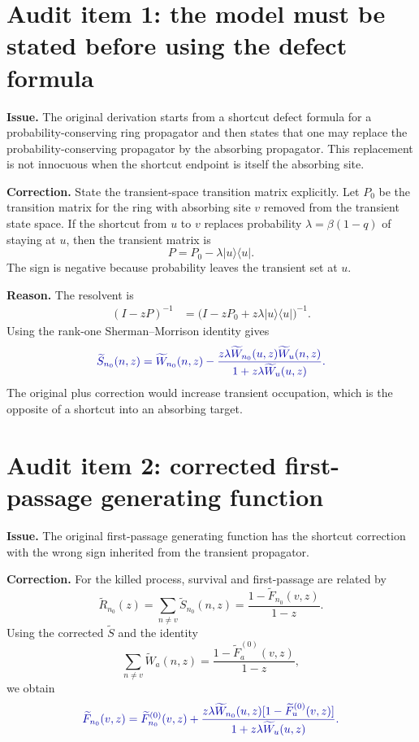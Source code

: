 \documentclass[11pt]{article}
\newcommand{\wt}{\widetilde}
\newcommand{\Corrected}[1]{\textcolor{blue!65!black}{#1}}
\newcommand{\Issue}[1]{\par\medskip\noindent\textbf{Issue.} #1\par}
\newcommand{\Fix}[1]{\par\noindent\textbf{Correction.} #1\par}
\newcommand{\Reason}[1]{\par\noindent\textbf{Reason.} #1\par\medskip}
\begin{document}
\section{Audit item 1: the model must be stated before using the defect formula}

\Issue{The original derivation starts from a shortcut defect formula for a probability-conserving
ring propagator and then states that one may replace the probability-conserving propagator by the
absorbing propagator.  This replacement is not innocuous when the shortcut endpoint is itself the
absorbing site.}

\Fix{State the transient-space transition matrix explicitly.  Let $P_0$ be the transition matrix
for the ring with absorbing site $v$ removed from the transient state space.  If the shortcut from
$u$ to $v$ replaces probability $\lambda=\beta(1-q)$ of staying at $u$, then the transient matrix is
\begin{equation}
  P=P_0-\lambda |u\rangle\langle u|.
\end{equation}
The sign is negative because probability leaves the transient set at $u$.}

\Reason{The resolvent is
\begin{align}
  (I-zP)^{-1}
  &=\bigl(I-zP_0+z\lambda |u\rangle\langle u|\bigr)^{-1}.
\end{align}
Using the rank-one Sherman--Morrison identity gives
\begin{equation}
  \Corrected{
  \wt S_{n_0}(n,z)=\wt W_{n_0}(n,z)
  -\frac{z\lambda\wt W_{n_0}(u,z)\wt W_u(n,z)}{1+z\lambda\wt W_u(u,z)}.}
\end{equation}
The original plus correction would increase transient occupation, which is the opposite of a
shortcut into an absorbing target.}

\section{Audit item 2: corrected first-passage generating function}

\Issue{The original first-passage generating function has the shortcut correction with the wrong
sign inherited from the transient propagator.}

\Fix{For the killed process, survival and first-passage are related by
\begin{equation}
  \wt R_{n_0}(z)=\sum_{n\neq v}\wt S_{n_0}(n,z)=\frac{1-\wt F_{n_0}(v,z)}{1-z}.
\end{equation}
Using the corrected $\wt S$ and the identity
\begin{equation}
  \sum_{n\neq v}\wt W_a(n,z)=\frac{1-\wt F_a^{(0)}(v,z)}{1-z},
\end{equation}
we obtain
\begin{equation}
  \Corrected{
  \wt F_{n_0}(v,z)=\wt F^{(0)}_{n_0}(v,z)+
  \frac{z\lambda\wt W_{n_0}(u,z)[1-\wt F_u^{(0)}(v,z)]}
  {1+z\lambda\wt W_u(u,z)}.}
\end{equation}}
\end{document}
